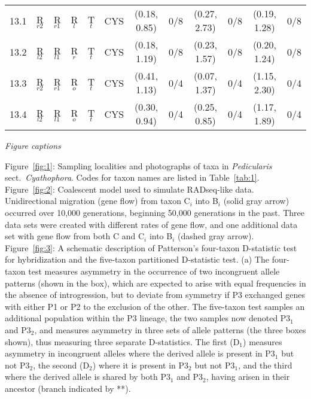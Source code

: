 \documentclass[12pt,letterpaper]{article}
\renewcommand{\subsection}[1]{%
\bigskip
\begin{center}
\begin{large}
\normalfont\itshape #1
\end{large}
\end{center}}
\begin{document}
\begin{sidewaystable}
\begin{center}
\begin{tabular*}{0.97\textwidth}{@{\extracolsep{\fill}}lccccc|cc|cc|cc}
13.1     & R$_{r2}$  & R$_{r1}$  & R$_l$    & T$_t$      &CYS    &(0.18, 0.85)    & 0/8        & (0.27, 2.73) & 0/8         & (0.19, 1.28)   & 0/8   \\
13.2     & R$_{l2}$  & R$_{l1}$  & R$_r$    & T$_t$      &CYS    &(0.18, 1.19)    & 0/8        & (0.23, 1.57) & 0/8         & (0.20, 1.24)   & 0/8   \\
13.3     & R$_{r2}$  & R$_{r1}$  & R$_o$    & T$_t$      &CYS    &(0.41, 1.13)    & 0/4        & (0.07, 1.37) & 0/4         & (1.15, 2.30)   & 0/4   \\
13.4     & R$_{l2}$  & R$_{l1}$  & R$_o$    & T$_t$      &CYS    &(0.30, 0.94)    & 0/4        & (0.25, 0.85) & 0/4         & (1.17, 1.89)   & 0/4   \\

\hline
\hline
\end{tabular*}
\end{center}
\end{sidewaystable}
\clearpage
\newpage


\subsection{Figure captions}


\noindent Figure~\ref{fig:1}: Sampling localities and photographs of taxa in \emph{Pedicularis} sect.~\emph{Cyathophora}. Codes for taxon names are listed in Table~\ref{tab:1}. \\

\noindent Figure~\ref{fig:2}: Coalescent model used to simulate RADseq-like data. Unidirectional migration (gene flow) from taxon C$_i$ into B$_i$ (solid gray arrow) occurred over 10,000 generations, beginning 50,000 generations in the past. Three data sets were created with different rates of gene flow, and one additional data set with gene flow from both C and C$_i$ into B$_i$ (dashed gray arrow). \\

\noindent Figure~\ref{fig:3}: A schematic description of Patterson's four-taxon D-statistic test for hybridization and the five-taxon partitioned D-statistic test. (a) The four-taxon test measures asymmetry in the occurrence of two incongruent allele patterns (shown in the box), which are expected to arise with equal frequencies in the absence of introgression, but to deviate from symmetry if P3 exchanged genes with either P1 or P2 to the exclusion of the other. The five-taxon test samples an additional population within the P3 lineage, the two samples now denoted P3$_1$ and P3$_2$, and measures asymmetry in three sets of allele patterns (the three boxes shown), thus measuring three separate D-statistics. The first (D$_1$) measures asymmetry in incongruent alleles where the derived allele is present in P3$_1$ but not P3$_2$, the second (D$_2$) where it is present in P3$_2$ but not P3$_1$, and the third where the derived allele is shared by both P3$_1$ and P3$_2$, having arisen in their ancestor (branch indicated by **). \\
\end{document}
